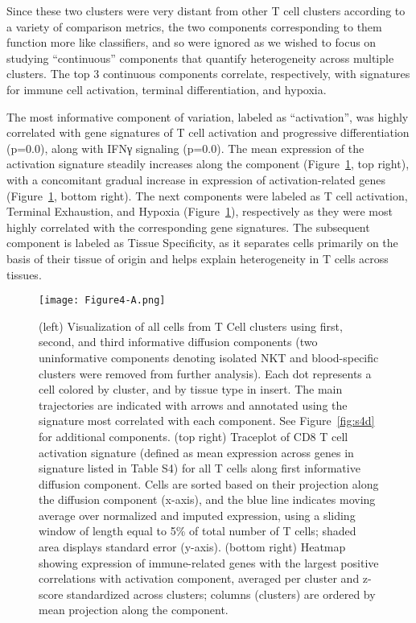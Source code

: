 Since these two clusters were very distant from other T cell clusters according to a variety of comparison metrics, the two components corresponding to them function more like classifiers, and so were ignored as we wished to focus on studying ``continuous'' components that quantify heterogeneity across multiple clusters.
The top 3 continuous components correlate, respectively, with signatures for immune cell activation, terminal differentiation, and hypoxia. %

The most informative component of variation, labeled as ``activation'', was highly correlated with gene signatures of T cell activation and progressive differentiation (p=0.0), along with IFNγ signaling (p=0.0).
The mean expression of the activation signature steadily increases along the component (Figure~\ref{fig:4a}, top right), with a concomitant gradual increase in expression of activation-related genes (Figure~\ref{fig:4a}, bottom right).
The next components were labeled as T cell activation, Terminal Exhaustion, and Hypoxia (Figure~\ref{fig:4a}), respectively as they were most highly correlated with the corresponding gene signatures. %
The subsequent component is labeled as Tissue Specificity, as it separates cells primarily on the basis of their tissue of origin and helps explain heterogeneity in T cells across tissues.

\begin{figure}
\centering
\texttt{[image: Figure4-A.png]}
\caption{(left) Visualization of all cells from T Cell clusters using first, second, and third informative diffusion components (two uninformative components denoting isolated NKT and blood-specific clusters were removed from further analysis).
  Each dot represents a cell colored by cluster, and by tissue type in insert.
  The main trajectories are indicated with arrows and annotated using the signature most correlated with each component.
  See Figure~\ref{fig:s4d} for additional components.
  (top right) Traceplot of CD8 T cell activation signature (defined as mean expression across genes in signature listed in Table S4) for all T cells along first informative diffusion component.
  Cells are sorted based on their projection along the diffusion component (x-axis), and the blue line indicates moving average over normalized and imputed expression, using a sliding window of length equal to 5\% of total number of T cells; shaded area displays standard error (y-axis).
  (bottom right) Heatmap showing expression of immune-related genes with the largest positive correlations with activation component, averaged per cluster and z-score standardized across clusters; columns (clusters) are ordered by mean projection along the component.
}
\label{fig:4a}
\end{figure}


